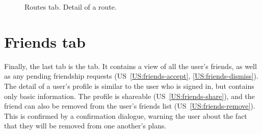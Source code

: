 \begin{figure}[h!]
    \centering
    \hfill
    \hfill
    \caption{Routes tab. Detail of a route.}
    \label{fig:routes}
\end{figure}

\section{Friends tab}
Finally, the last tab is the  tab.
It contains a view of all the user's friends, as well as any pending friendship requests (US~\ref{US:friends-accept}, \ref{US:friends-dismiss}).
The detail of a user's profile is similar to the user who is signed in, but contains only basic information.
The profile is shareable (US~\ref{US:friends-share}), and the friend can also be removed from the user's friends list (US~\ref{US:friends-remove}).
This is confirmed by a confirmation dialogue, warning the user about the fact that they will be removed from one another's plans.

